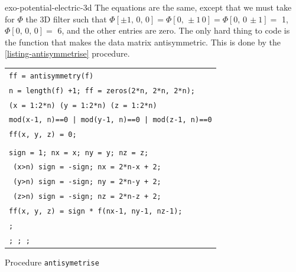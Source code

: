  
\begin{correction}{exo-potential-electric-3d}
The equations are the same, except that we must take for $ \Phi $ the 3D filter such that $ \Phi [\pm 1, \, 0, \, 0] = \Phi [0, \, \pm 1 \, 0] = \Phi [0, \, 0 \, \pm 1] = $ 1, $ \Phi [0, \, 0, \, 0] = $ 6, and the other entries are zero. The only hard thing to code is the function that makes the data matrix antisymmetric. This is done by the \Matlab{} \ref{listing-antisymmetrise} procedure.

\begin{listing} 
\begin{footnotesize}
{\upshape
\begin{tabular}{l} \texttt{\pfunction ff = antisymmetry(f)} \\
\texttt{n = length(f) +1; ff = zeros(2*n, 2*n, 2*n);} \\
\texttt{\pfor{}(x = 1:2*n) \pfor{}(y = 1:2*n) \pfor{}(z = 1:2*n)} \\
\quad \texttt{\pif mod(x-1, n)==0 | mod(y-1, n)==0 | mod(z-1, n)==0} \\
\quad \quad \texttt{ff(x, y, z) = 0;} \\
\quad \texttt{\pelse} \\
\quad \quad \texttt{sign = 1; nx = x; ny = y; nz = z;} \\
\quad \quad \texttt{\pif{} (x>n) sign = -sign; nx = 2*n-x + 2; \pend} \\
\quad \quad \texttt{\pif{} (y>n) sign = -sign; ny = 2*n-y + 2; \pend} \\
\quad \quad \texttt{\pif{} (z>n) sign = -sign; nz = 2*n-z + 2; \pend} \\
\quad \quad \texttt{ff(x, y, z) = sign * f(nx-1, ny-1, nz-1);} \\
\quad \texttt{\pend{};} \\
\texttt{\pend{}; \pend{}; \pend{};} \\
\end{tabular}
}
\end{footnotesize}
\caption{Procedure \texttt{\upshape antisymetrise}}
\label{listing-antisymmetrise}
\end{listing}
\end{correction}
 
